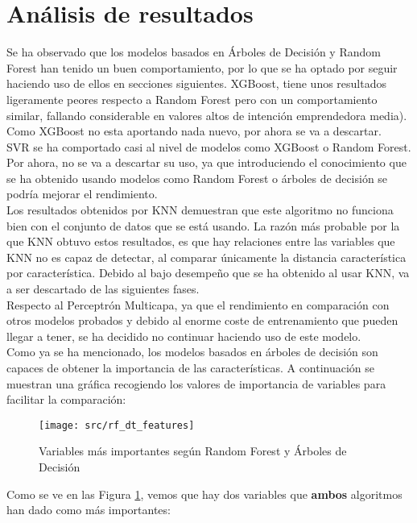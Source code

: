 \section{Análisis de resultados}
Se ha observado que los modelos basados en Árboles de Decisión y Random Forest han tenido un buen comportamiento, por lo que se ha optado por seguir haciendo uso de ellos en secciones siguientes. XGBoost, tiene unos resultados ligeramente peores respecto a Random Forest pero con un comportamiento similar, fallando considerable en valores altos de intención emprendedora media). Como XGBoost no esta aportando nada nuevo, por ahora se va a descartar.\\
\linebreak
SVR se ha comportado casi al nivel de modelos como XGBoost o Random Forest. Por ahora, no se va a descartar su uso, ya que introduciendo el conocimiento que se ha obtenido usando modelos como Random Forest o árboles de decisión se podría mejorar el rendimiento.\\
\linebreak
Los resultados obtenidos por  KNN demuestran que este algoritmo no funciona bien con el conjunto de datos que se está usando. La razón más probable por la que KNN obtuvo estos resultados, es que hay relaciones entre las variables que KNN no es capaz de detectar, al comparar únicamente la distancia característica por característica. Debido al bajo desempeño que se ha obtenido al usar KNN, va a ser descartado de las siguientes fases.\\
\linebreak
Respecto al Perceptrón Multicapa, ya que el rendimiento en comparación con otros modelos probados y debido al enorme coste de entrenamiento que pueden llegar a tener, se ha decidido no continuar haciendo uso de este modelo.\\
\linebreak
Como ya se ha mencionado, los modelos basados en árboles de decisión son capaces de obtener la importancia de las características. A continuación se muestran una gráfica recogiendo los valores de importancia de variables para facilitar la comparación:
\begin{figure}[H]
	\centering
	\texttt{[image: src/rf\_dt\_features]}
	\caption{Variables más importantes según Random Forest y Árboles de Decisión}
	\label{fig:feature_rf2}
\end{figure}
Como se ve en las Figura \ref{fig:feature_rf2}, vemos que hay dos variables que \textbf{ambos} algoritmos han dado como más importantes:
